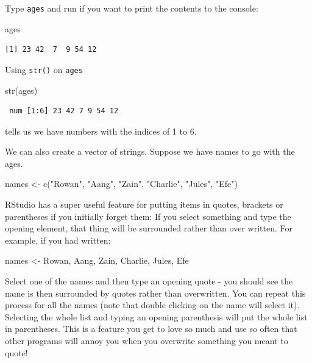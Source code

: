 \documentclass[
  letterpaper,
  DIV=11,
  numbers=noendperiod]{scrreprt}
\newenvironment{Shaded}{\begin{snugshade}}{\end{snugshade}}
\newcommand{\FunctionTok}[1]{\textcolor[rgb]{0.28,0.35,0.67}{#1}}
\newcommand{\NormalTok}[1]{\textcolor[rgb]{0.00,0.23,0.31}{#1}}
\newcommand{\OtherTok}[1]{\textcolor[rgb]{0.00,0.23,0.31}{#1}}
\newcommand{\StringTok}[1]{\textcolor[rgb]{0.13,0.47,0.30}{#1}}
\begin{document}
Type \texttt{ages} and run if you want to print the contents to the
console:

\begin{Shaded}
\begin{Highlighting}[]
\NormalTok{ages}
\end{Highlighting}
\end{Shaded}

\begin{verbatim}
[1] 23 42  7  9 54 12
\end{verbatim}

Using \texttt{str()} on \texttt{ages}

\begin{Shaded}
\begin{Highlighting}[]
\FunctionTok{str}\NormalTok{(ages)}
\end{Highlighting}
\end{Shaded}

\begin{verbatim}
 num [1:6] 23 42 7 9 54 12
\end{verbatim}

tells us we have numbers with the indices of 1 to 6.

We can also create a vector of strings. Suppose we have names to go with
the ages.

\begin{Shaded}
\begin{Highlighting}[]
\NormalTok{names }\OtherTok{\textless{}{-}} \FunctionTok{c}\NormalTok{(}\StringTok{"Rowan"}\NormalTok{, }\StringTok{"Aang"}\NormalTok{, }\StringTok{"Zain"}\NormalTok{, }\StringTok{"Charlie"}\NormalTok{, }\StringTok{"Jules"}\NormalTok{, }\StringTok{"Efe"}\NormalTok{)}
\end{Highlighting}
\end{Shaded}

RStudio has a super useful feature for putting items in quotes, brackets
or parentheses if you initially forget them: If you select something and
type the opening element, that thing will be surrounded rather than over
written. For example, if you had written:

\begin{Shaded}
\begin{Highlighting}[]
\NormalTok{names }\OtherTok{\textless{}{-}}\NormalTok{ Rowan, Aang, Zain, Charlie, Jules, Efe}
\end{Highlighting}
\end{Shaded}

Select one of the names and then type an opening quote - you should see
the name is then surrounded by quotes rather than overwritten. You can
repeat this process for all the names (note that double clicking on the
name will select it). Selecting the whole list and typing an opening
parenthesis will put the whole list in parentheses. This is a feature
you get to love so much and use so often that other programs will annoy
you when you overwrite something you meant to quote!
\end{document}
